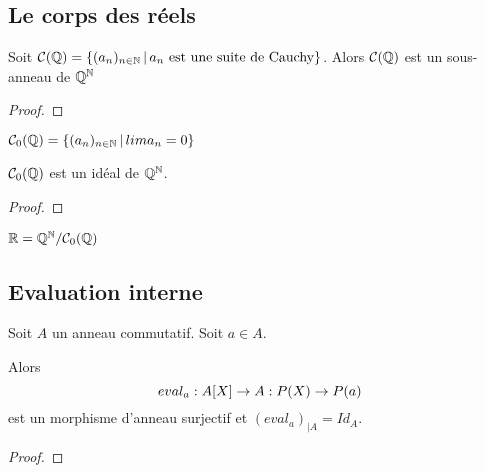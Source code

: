 \subsection{Le corps des réels}

\begin{proposition}
	Soit $\mathcal{C}(\mathbb{Q}) =
	\left\{(a_{n})_{n \in \mathbb{N}} \, | \, a_{n} \text{ est une suite de Cauchy} \right\}$.
	Alors $\mathcal{C}(\mathbb{Q})$ est un sous-anneau de $\mathbb{Q}^{\mathbb{N}}$
\end{proposition}

\ifdefined\outputproof
\begin{proof}

\end{proof}
\fi

\begin{definition}
	$\mathcal{C}_{0}(\mathbb{Q}) = \left\{(a_{n})_{n \in \mathbb{N}} \, | \, lim
		a_{n} = 0 \right\}$
\end{definition}

\begin{proposition}
	$\mathcal{C}_{0}(\mathbb{Q})$ est un idéal de $\mathbb{Q}^{\mathbb{N}}$.
\end{proposition}

\ifdefined\outputproof
\begin{proof}

\end{proof}
\fi

\begin{definition}
	$\mathbb{R} = \mathbb{Q}^{\mathbb{N}} / \mathcal{C}_{0}(\mathbb{Q})$
\end{definition}

\subsection{Evaluation interne}

\begin{proposition}
	Soit $A$ un anneau commutatif. Soit $a \in A$.

	Alors
	\begin{equation}
		eval_{a} : A[X] \rightarrow A : P(X) \rightarrow P(a)
	\end{equation}
	est un morphisme d'anneau surjectif et ${(eval_{a})}_{|A} = Id_{A}$.
\end{proposition}

\ifdefined\outputproof
\begin{proof}

\end{proof}
\fi

